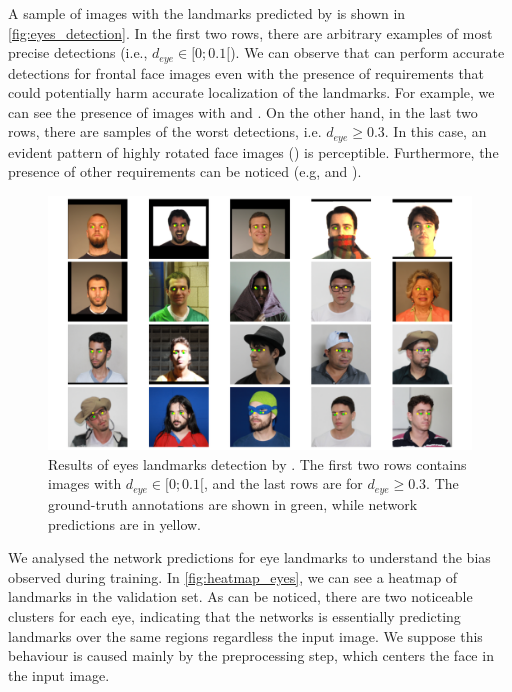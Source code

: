 A sample of images with the landmarks predicted by \methodname is shown in \autoref{fig:eyes_detection}. In the first two rows, there are arbitrary examples of most precise detections (i.e., $d_{eye} \in [0;0.1[$). We can observe that \methodname can perform accurate detections for frontal face images even with the presence of requirements that could potentially harm accurate localization of the landmarks. For example, we can see the presence of images with \framecoveringeyes and \toodarklight. On the other hand, in the last two rows, there are samples of the worst detections, i.e. $d_{eye} \geq 0.3$. In this case, an evident pattern of highly rotated face images (\rollpitchyaw) is perceptible. Furthermore, the presence of other requirements can be noticed (e.g, \blurred and \framestooheavy).

\begin{figure}[h]
\centering
\includegraphics[width=\linewidth]{images/eyes/detections.pdf}
\caption{Results of eyes landmarks detection by \methodname. The first two rows contains images with $d_{eye} \in [0;0.1[$, and the last rows are for $d_{eye} \geq 0.3$. The ground-truth annotations are shown in green, while network predictions are in yellow.}
\label{fig:eyes_detection}
\end{figure}

We analysed the network predictions for eye landmarks to understand the bias observed during training. In \autoref{fig:heatmap_eyes}, we can see a heatmap of landmarks in the validation set. As can be noticed, there are two noticeable clusters for each eye, indicating that the networks is essentially predicting landmarks over the same regions regardless the input image. We suppose this behaviour is caused mainly by the preprocessing step, which centers the face in the input image.

